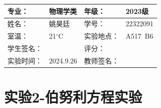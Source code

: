 \documentclass[dvipsnames, svgnames,a4paper,11pt]{article}
\begin{document}
\clearpage
{}
\begin{table}
	\renewcommand\arraystretch{1.7}
	\centering
	\begin{tabularx}{\textwidth}{|X|X|X|X|}
	\hline
	专业：& 物理学类 &年级：& 2023级 \\
	\hline
	姓名：& 姚昊廷 &学号：&22322091  \\
	\hline
	室温：&21$^\circ$C&实验地点：&A517\ B6\\
	\hline
	学生签名：& & 评分： &\\
	\hline
	实验时间：& 2024.9.26& 教师签名：&\\
	\hline
	\end{tabularx}
\end{table}

\section{实验2-伯努利方程实验}
\end{document}

